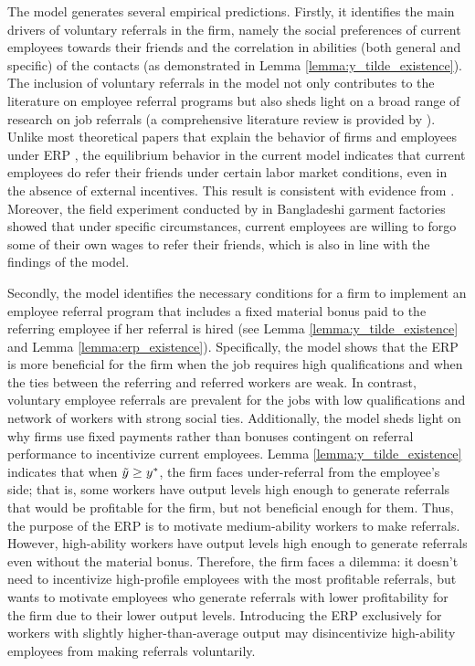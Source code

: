 \documentclass[12pt]{article}
\begin{document}
The model generates several empirical predictions. Firstly, it identifies the main drivers of voluntary referrals in the firm, namely the social preferences of current employees towards their friends and the correlation in abilities (both general and specific) of the contacts (as demonstrated in Lemma \ref{lemma:y_tilde_existence}). The inclusion of voluntary referrals in the model not only contributes to the literature on employee referral programs but also sheds light on a broad range of research on job referrals (a comprehensive literature review is provided by \cite{topa2011labor}). Unlike most theoretical papers that explain the behavior of firms and employees under ERP \citep{beaman2012gets, ekinci2016employee}, the equilibrium behavior in the current model indicates that current employees do refer their friends under certain labor market conditions, even in the absence of external incentives. This result is consistent with evidence from \cite{holzer1987hiring, granovetter1995getting, pellizzari2010friends, lester2021heterogeneous}. Moreover, the field experiment conducted by \cite{heath2018firms} in Bangladeshi garment factories showed that under specific circumstances, current employees are willing to forgo some of their own wages to refer their friends, which is also in line with the findings of the model.

Secondly, the model identifies the necessary conditions for a firm to implement an employee referral program that includes a fixed material bonus paid to the referring employee if her referral is hired (see Lemma \ref{lemma:y_tilde_existence} and Lemma \ref{lemma:erp_existence}). Specifically, the model shows that the ERP is more beneficial for the firm when the job requires high qualifications and when the ties between the referring and referred workers are weak. In contrast, voluntary employee referrals are prevalent for the jobs with low qualifications and network of workers with strong social ties. Additionally, the model sheds light on why firms use fixed payments rather than bonuses contingent on referral performance to incentivize current employees. Lemma \ref{lemma:y_tilde_existence} indicates that when $\Tilde{y} \geq y^*$, the firm faces under-referral from the employee's side; that is, some workers have output levels high enough to generate referrals that would be profitable for the firm, but not beneficial enough for them. Thus, the purpose of the ERP is to motivate medium-ability workers to make referrals. However, high-ability workers have output levels high enough to generate referrals even without the material bonus. Therefore, the firm faces a dilemma: it doesn't need to incentivize high-profile employees with the most profitable referrals, but wants to motivate employees who generate referrals with lower profitability for the firm due to their lower output levels. Introducing the ERP exclusively for workers with slightly higher-than-average output  may disincentivize high-ability employees from making referrals voluntarily.
\end{document}
